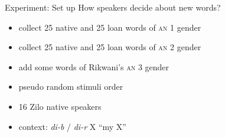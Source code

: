 \documentclass[13pt, t]{beamer}
\begin{document}


\begin{frame}{Experiment: Set up}
\alert{How speakers decide about new words?}
\begin{itemize}
\item collect 25 native and 25 loan words of \textsc{an} 1 gender
\item collect 25 native and 25 loan words of \textsc{an} 2 gender
\item add some words of Rikwani's \textsc{an} 3 gender
\item pseudo random stimuli order
\item 16 Zilo native speakers
\item context:  \textit{di-b} / \textit{di-r} X ``my  X''
\end{itemize}
\end{frame}
\end{document}
